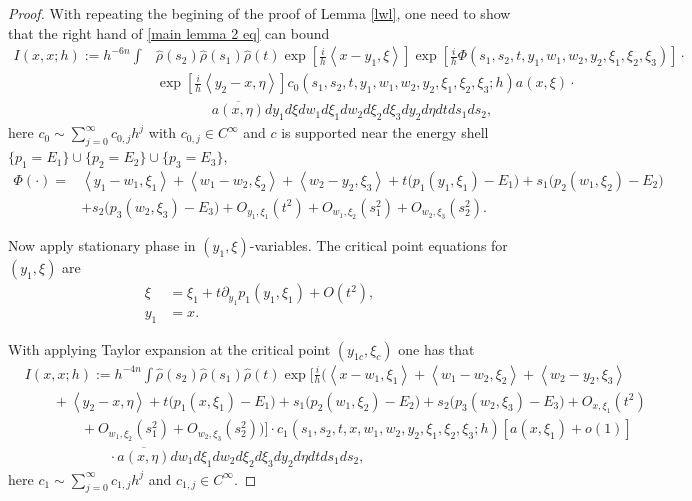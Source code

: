 \documentclass[12pt,reqno]{amsart}
\numberwithin{equation}{section}
\begin{document}
\begin{proof}
With repeating the begining of the proof of Lemma \ref{lwl}, one need to show that the right hand of \eqref{main lemma 2 eq} can bound
\begin{align}
I(x,x;h):=h^{- 6n}\int &\hat{\rho}(s_2)\hat{\rho}(s_1)\hat{\rho}(t) \exp[\frac{i}h \left<x-y_1, \xi\right>] \exp[\frac{i}h \Phi(s_1, s_2,t,y_1, w_1, w_2, y_2, \xi_1, \xi_2, \xi_3)]\cdot  \nonumber \\
& \exp[\frac{i}h \left<y_2-x, \eta\right>] c_0(s_1, s_2,t,y_1,w_1,w_2,y_2,\xi_1,\xi_2,\xi_3;h) a(x, \xi) \cdot \nonumber \\
 &\qquad\qquad \overline{a(x, \eta)} dy_1 d\xi dw_1 d\xi_1 dw_2 d\xi_2 d\xi_3 dy_2 d\eta dt ds_1 ds_2,
\end{align}
here $c_0\sim \sum_{j=0}^\infty c_{0,j} h^j$ with $c_{0,j}\in C^\infty$ and $c$ is supported near the energy shell $\{p_1=E_1\}\cup\{p_2=E_2\}\cup\{p_3=E_3\}$, 
\begin{align*}
\Phi(\cdot)=&\left<y_1-w_1,\xi_1 \right>+\left<w_1-w_2, \xi_2\right>+\left<w_2-y_2, \xi_3\right> +t\big(p_1(y_1,\xi_1)-E_1\big)+s_1\big( p_2(w_1,\xi_2)-E_2 \big)\nonumber \\
&+s_2\big( p_3(w_2,\xi_3)-E_3 \big)+O_{y_1,\xi_1}(t^2)+O_{w_1,\xi_2}(s_1^2)+O_{w_2,\xi_3}(s_2^2).
\end{align*}

Now apply stationary phase in $(y_1, \xi)$-variables. The critical point equations for $(y_1, \xi)$ are
\begin{align}
\xi&=\xi_1+ t\partial_{y_1} p_1(y_1,\xi_1)+ O(t^2), \\
y_1&=x.
\end{align}

With applying Taylor expansion at the critical point $(y_{1c}, \xi_{c})$ one has that
\begin{align}
&I (x,x; h):=h^{-4n}\int \hat{\rho}(s_2)\hat{\rho}(s_1)\hat{\rho}(t)  \exp\Big[\frac{i}h\Big(\left<x-w_1, \xi_1\right>+\left<w_1-w_2,\xi_2\right>+\left<w_2-y_2,\xi_3\right> \nonumber \\
&\qquad+\left<y_2-x, \eta\right> +t(p_1(x,\xi_1)-E_1\big)+ s_1\big(p_2(w_1,\xi_2)-E_2\big) +s_2\big( p_3(w_2,\xi_3)-E_3 \big)+O_{x,\xi_1}(t^2) \nonumber\\
&\qquad\qquad + O_{w_1,\xi_2}(s_1^2)+O_{w_2,\xi_3}(s_2^2) \Big)\Big]\cdot c_1(s_1, s_2,t,x, w_1,w_2,y_2,\xi_1,\xi_2,\xi_3;h)[a(x, \xi_1)+o(1)]  \nonumber\\
&\qquad\qquad\qquad \cdot \overline{a(x, \eta)} dw_1 d\xi_1 dw_2 d\xi_2 d\xi_3 dy_2 d\eta dt ds_1 ds_2, 
\end{align}
here $c_1\sim \sum_{j=0}^\infty c_{1,j} h^j$ and $c_{1,j}\in C^\infty$.


\end{proof}
\end{document}
